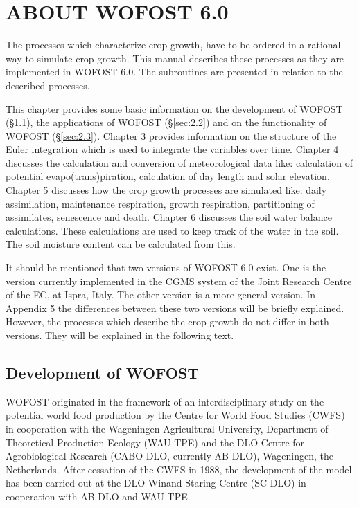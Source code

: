 \chapter{ABOUT WOFOST 6.0}

The processes which characterize crop growth, have to be ordered in a rational way to
simulate crop growth. This manual describes these processes as they are imple\-ment\-ed in
WOFOST 6.0. The subroutines are presented in relation to the described process\-es. 

This chapter provides some basic information on the development of WOFOST (\S \ref{sec:2.1}),
the applications of WOFOST (\S \ref{sec:2.2}) and on the function\-ality of WOFOST (\S \ref{sec:2.3}). 
Chapter 3 provides information on the structure of the Euler integra\-tion which is used to integrate
the variables over time. Chapter 4 discusses the calculation and conversion of meteorolog\-ical data like: calculation of potential evapo\-(trans)piration, calculation of day length and
solar elevation. Chapter 5 discusses how the crop growth processes are simulated like:
daily assimilation, mainte\-nance respiration, growth respira\-tion, parti\-tioning of assimilates,
senes\-cence and death. Chapter 6 discusses the soil water balance calcula\-tions. These
calculations are used to keep track of the water in the soil. The soil moisture content can
be calculated from this.

It should be mentioned that two versions of WOFOST 6.0 exist. One is the version
currently implemented in the CGMS system of the Joint Research Centre of the EC, at
Ispra, Italy. The other version is a more general version. In Appendix 5 the differences
between these two versions will be briefly explained. However, the processes which
describe the crop growth do not differ in both versions. They will be explained in the
following text.

\section{Development of WOFOST}
\label{sec:2.1}

WOFOST originated in the framework of an interdisciplinary study on the potential world
food production by the Centre for World Food Studies (CWFS) in coopera\-tion with the
Wageningen Agricultu\-ral Univer\-sity, Depart\-ment of Theoretical Production Ecology
(WAU-TPE) and the DLO-Centre for Agrobiolo\-gi\-cal Re\-search (CABO-DLO, currently
AB-DLO), Wagenin\-gen, the Nether\-lands. After cessa\-tion of the CWFS in 1988, the 
deve\-lopment of the model has been carried out at the DLO-Winand Staring Centre (SC-DLO)
in cooperation with AB-DLO and WAU-TPE.

